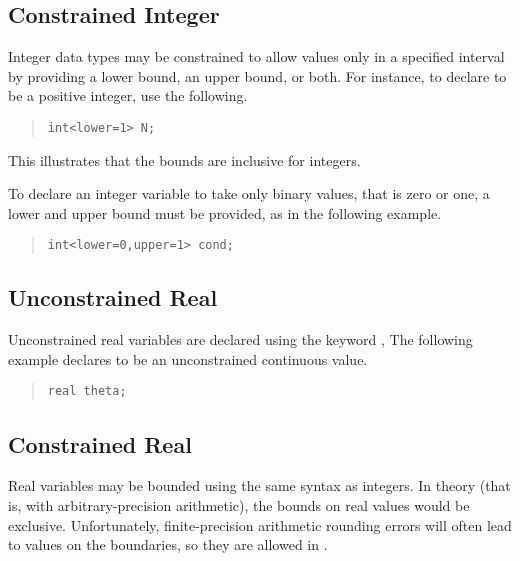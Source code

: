 \subsection{Constrained Integer}

Integer data types may be constrained to allow values only in a
specified interval by providing a lower bound, an upper bound, or
both.  For instance, to declare  to be a positive integer, use
the following.
%
\begin{quote}
\begin{Verbatim}
int<lower=1> N;
\end{Verbatim}
\end{quote}
%
This illustrates that the bounds are inclusive for integers.

To declare an integer variable  to take only binary values,
that is zero or one, a lower and upper bound must be provided, as in
the following example.
%
\begin{quote}
\begin{Verbatim} 
int<lower=0,upper=1> cond;
\end{Verbatim}
\end{quote}


\subsection{Unconstrained Real}

Unconstrained real variables are declared using the keyword
, The following example declares  to be an
unconstrained continuous value.
%
\begin{quote}
\begin{Verbatim}
real theta;
\end{Verbatim}
\end{quote}
%

\subsection{Constrained Real}

Real variables may be bounded using the same syntax as integers.  In
theory (that is, with arbitrary-precision arithmetic), the bounds on
real values would be exclusive.  Unfortunately, finite-precision
arithmetic rounding errors will often lead to values on the
boundaries, so they are allowed in \Stan.
 
